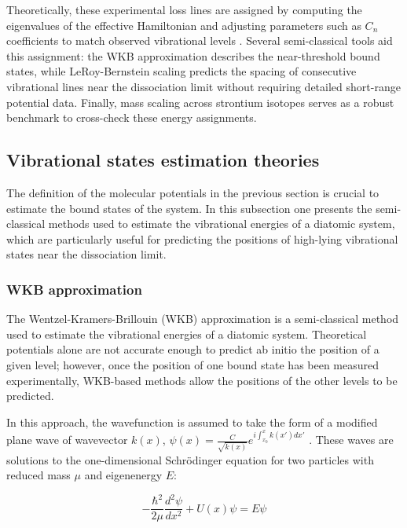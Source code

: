 Theoretically, these experimental loss lines are assigned by computing the eigenvalues of the effective Hamiltonian and adjusting parameters such as $C_n$ coefficients to match observed vibrational levels 
\cite{borkowski_line_2009}. Several semi-classical tools aid this assignment: the WKB approximation describes the near-threshold bound states, while LeRoy-Bernstein scaling predicts the spacing of consecutive 
vibrational lines near the dissociation limit without requiring detailed short-range potential data. Finally, mass scaling across strontium isotopes \cite{borkowski_mass_2014} serves as a robust benchmark to 
cross-check these energy assignments.


\subsection{Vibrational states estimation theories}
The definition of the molecular potentials in the previous section is crucial to estimate the 
bound states of the system. In this subsection one presents the semi-classical methods used to estimate the vibrational energies of a diatomic system, which are particularly useful for predicting the positions of high-lying vibrational states near the dissociation limit.

\subsubsection{WKB approximation}

The Wentzel-Kramers-Brillouin (WKB) approximation is a semi-classical method used to estimate
the vibrational energies of a diatomic system. Theoretical potentials alone are not accurate
enough to predict ab initio the position of a given level; however, once the position of one
bound state has been measured experimentally, WKB-based methods allow the positions of the
other levels to be predicted.

In this approach, the wavefunction is assumed to take the form of a modified plane wave of wavevector $k(x)$,
$\psi(x) = \frac{C}{\sqrt{k(x)}}e^{i\int_{x_0}^{x} k(x') dx'}$ \cite{sakurai2020modern}. These waves are solutions 
to the one-dimensional Schrödinger equation for two particles with reduced mass $\mu$ and 
eigenenergy $E$:

\begin{equation}
    -\frac{\hbar^2}{2\mu}\frac{d^2\psi}{dx^2} + U(x)\psi = E\psi
    \label{eq:schrodinger_1d}
\end{equation}

